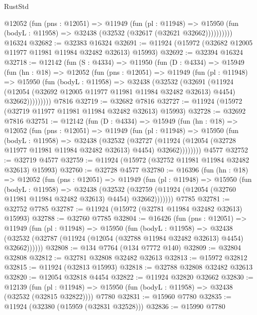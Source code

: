 \begin{lexlean}{RustStd}
\begin{coremodule}
          @12052
            (fun (pns : @12051) =>
            @11949
              (fun (pl : @11948) =>
              @15950 (fun (bodyL : @11958) => @32438 (@32532 (@32617 (@32621 @32662))))))))))
    @16324
@32682 := @32383 @16324
@32691 := @11924 (@15972 (@32682 @12005 @11977 @11981 @11984 @32482 @32613) @15993)
@32692 := @32394 @16324
@32718 := @12142
    (fun (S : @4334) =>
    @11950
      (fun (D : @4334) =>
      @15949
        (fun (hn : @18) =>
        @12052
          (fun (pns : @12051) =>
          @11949
            (fun (pl : @11948) =>
            @15950
              (fun (bodyL : @11958) =>
              @32438
                (@32532
                  (@32691
                    (@11924
                      (@12054 (@32692 @12005 @11977 @11981 @11984 @32482 @32613) @4454)
                      @32662)))))))))
    @7816
@32719 := @32682 @7816
@32727 := @11924 (@15972 (@32719 @11977 @11981 @11984 @32482 @32613) @15993)
@32728 := @32692 @7816
@32751 := @12142
    (fun (D : @4334) =>
    @15949
      (fun (hn : @18) =>
      @12052
        (fun (pns : @12051) =>
        @11949
          (fun (pl : @11948) =>
          @15950
            (fun (bodyL : @11958) =>
            @32438
              (@32532
                (@32727
                  (@11924 (@12054 (@32728 @11977 @11981 @11984 @32482 @32613) @4454) @32662))))))))
    @4577
@32752 := @32719 @4577
@32759 := @11924 (@15972 (@32752 @11981 @11984 @32482 @32613) @15993)
@32760 := @32728 @4577
@32780 := @16396
    (fun (hn : @18) =>
    @12052
      (fun (pns : @12051) =>
      @11949
        (fun (pl : @11948) =>
        @15950
          (fun (bodyL : @11958) =>
          @32438
            (@32532
              (@32759 (@11924 (@12054 (@32760 @11981 @11984 @32482 @32613) @4454) @32662)))))))
    @7785
@32781 := @32752 @7785
@32787 := @11924 (@15972 (@32781 @11984 @32482 @32613) @15993)
@32788 := @32760 @7785
@32804 := @16426
    (fun (pns : @12051) =>
    @11949
      (fun (pl : @11948) =>
      @15950
        (fun (bodyL : @11958) =>
        @32438 (@32532 (@32787 (@11924 (@12054 (@32788 @11984 @32482 @32613) @4454) @32662))))))
@32808 := @134 @7764 (@134 @7772 @140)
@32809 := @32804 @32808
@32812 := @32781 @32808 @32482 @32613
@32813 := @15972 @32812
@32815 := @11924 (@32813 @15993)
@32818 := @32788 @32808 @32482 @32613
@32820 := @12054 @32818 @4454
@32822 := @11924 @32820 @32662
@32830 := @12139
    (fun (pl : @11948) => @15950 (fun (bodyL : @11958) => @32438 (@32532 (@32815 @32822))))
    @7780
@32831 := @15960 @7780
@32835 := @11924 (@32380 (@15959 (@32831 @32528)))
@32836 := @15990 @7780

\end{coremodule}
\end{lexlean}

